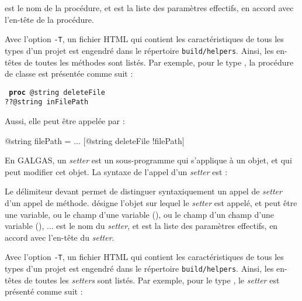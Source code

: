 {{ est le nom de la procédure, et  est la liste des paramètres effectifs, en accord avec l'en-tête de la procédure.

Avec l'option \texttt{-T}, un fichier HTML qui contient les caractéristiques de tous les types d'un projet est engendré dans le répertoire \texttt{build/helpers}. Ainsi, les en-têtes de toutes les méthodes sont listés. Par exemple, pour le type , la procédure de classe  est présentée comme suit :

\texttt{
\textbf{proc} @string deleteFile\\
\hspace*{1cm}??@string inFilePath\\
}

Aussi, elle peut être appelée par :
\begin{galgascode}
@string filePath = ...
[@string deleteFile !filePath]
\end{galgascode}











En GALGAS, un \emph{setter} est un sous-programme qui s'applique à un objet, et qui peut modifier cet objet. La syntaxe de l'appel d'un  \emph{setter} est :
\begin{galgascode}
\end{galgascode}

Le délimiteur  devant  permet de distinguer syntaxiquement un appel de \emph{setter} d'un appel de méthode.  désigne l'objet sur lequel le \emph{setter} est appelé, et peut être une variable, ou le champ d'une variable (), ou le champ d'un champ d'une variable (), ...  est le nom du \emph{setter}, et  est la liste des paramètres effectifs, en accord avec l'en-tête du \emph{setter}.

Avec l'option \texttt{-T}, un fichier HTML qui contient les caractéristiques de tous les types d'un projet est engendré dans le répertoire \texttt{build/helpers}. Ainsi, les en-têtes de toutes les \emph{setters} sont listés. Par exemple, pour le type , le \emph{setter}  est présenté comme suit :

}}
